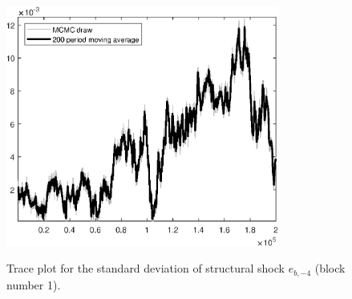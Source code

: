 \begin{figure}[H]
\centering
  \includegraphics[width=0.8\textwidth]{BRS_sectoral_rest/graphs/TracePlot_SE_e_b_news_blck_1}\\
    \caption{Trace plot for the standard deviation of structural shock ${e_{b,-4}}$ (block number 1).}
\end{figure}
